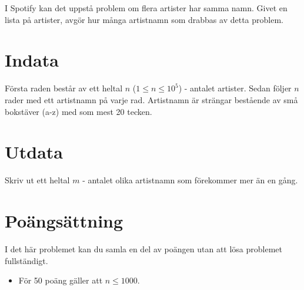 
I Spotify kan det uppstå problem om flera artister har samma namn. Givet en lista på artister, avgör hur många artistnamn som drabbas av detta problem.

\section*{Indata}

Första raden består av ett heltal $n$ ($1 \leq n \leq 10^5$) - antalet artister. Sedan följer $n$ rader med ett artistnamn på varje rad. Artistnamn är strängar bestående av små bokstäver (a-z) med som mest 20 tecken.

\section*{Utdata}

Skriv ut ett heltal $m$ - antalet olika artistnamn som förekommer mer än en gång.

\section*{Poängsättning}

I det här problemet kan du samla en del av poängen utan att lösa problemet fullständigt.

\begin{itemize}

	\item För 50 poäng gäller att $n \leq 1000$.

\end{itemize}

